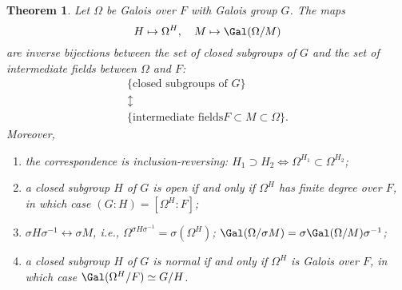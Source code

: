 \documentclass[a4paper,11pt,final,openany]{memoir}
\newtheorem{theorem}[X]{Theorem}
\theoremstyle{nonumberplain}
\begin{document}
\begin{theorem}
\label{ig6}Let $\Omega$ be Galois over $F$ with Galois group $G$. The maps
\[
H\mapsto\Omega^{H},\quad M\mapsto\Gal(\Omega/M)
\]
are inverse bijections between the set of closed subgroups of $G$ and the set
of intermediate fields between $\Omega$ and $F$:%
\begin{gather*}
\{\text{closed subgroups of }G\}\\
\updownarrow\\
\{\text{intermediate fields
}F\subset M\subset\Omega\}.
\end{gather*}
Moreover,

\begin{enumerate}
\item the correspondence is inclusion-reversing: $H_{1}\supset H_{2}\iff
\Omega^{H_{1}}\subset\Omega^{H_{2}}$;

\item a closed subgroup $H$ of $G$ is open if and only if $\Omega^{H}$ has
finite degree over $F$, in which case $(G\colon H)=[\Omega^{H}\colon F]$;

\item $\sigma H\sigma^{-1}\leftrightarrow\sigma M$, i.e., $\Omega^{\sigma
H\sigma^{-1}}=\sigma(\Omega^{H})$; $\Gal(\Omega/\sigma M)=\sigma
\Gal(\Omega/M)\sigma^{-1}$;

\item a closed subgroup $H$ of $G$ is normal if and only if $\Omega^{H}$ is
Galois over $F$, in which case $\Gal(\Omega^{H}/F)\simeq G/H$.
\end{enumerate}
\end{theorem}
\end{document}
